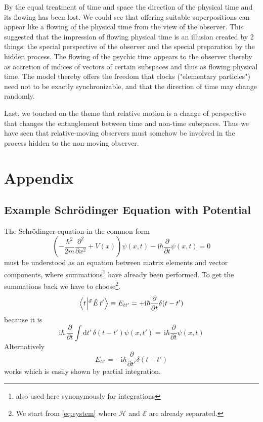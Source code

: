 \documentclass[12pt]{article}
\begin{document}
By the equal treatment of time and space the direction of the physical time and its flowing has been lost. We could see that offering suitable superpositions can appear like a flowing of the physical time from the view of the observer. This suggested that the impression of flowing physical time is an illusion created by 2 things: the special perspective of the observer and the special preparation by the hidden process. The flowing of the psychic time appears to the observer thereby as accretion of indices of vectors of certain subspaces and thus as flowing physical time. The model thereby offers the freedom that clocks ("elementary particles") need not to be exactly synchronizable, and that the direction of time may change randomly. 

Last, we touched on the theme that relative motion is a change of perspective that changes the entanglement between time and non-time subspaces. Thus we have seen that relative-moving observers must somehow be involved in the process hidden to the non-moving observer.

\section{Appendix}
\subsection{Example Schrödinger Equation with Potential}
The Schrödinger equation in the common form 
\begin{equation*}
\left(-\frac {\hbar^2}{2m}\frac{\partial^2}{\partial x^2} +V(x)\right)\psi(x,t)
-\mathrm {i} \hbar \frac {\partial }{\partial t}\psi(x,t) = 0
\end{equation*} 
must be understood as an equation between matrix elements and vector components, where summations\footnote{also used here synonymously for integrations} have already been performed. To get the summations back we have to choose\footnote{We start from \eqref{eq:system} where $\mathscr{H}$ and $\mathscr{E}$ are already separated.}.\begin{equation*}
\bra{t}\ket{^\mathscr{E}\hat{E}\,t'}\equiv E_{tt'} = 
+\mathrm {i} \hbar \frac{\partial }{\partial t}\delta(t-t')
\end{equation*} 
because it is 
\begin{equation*}
\mathrm{i}\hbar\,\frac{\partial }{\partial t} \int \mathrm{d}t'\,\delta(t-t') \psi (x ,t')
=\, \mathrm {i} \hbar \frac {\partial }{\partial t}\psi (x ,t)
\end{equation*}
Alternatively 
\begin{equation*}
E_{tt'} = - \mathrm {i} \hbar \frac{\partial }{\partial t'}\delta(t-t')
\end{equation*} 
works which is easily shown by partial integration.
\end{document}

